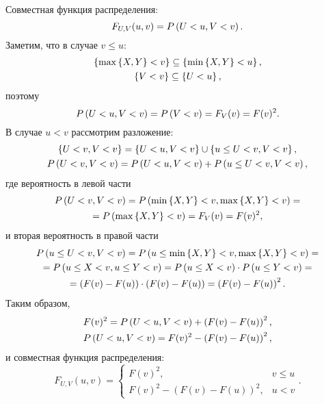Совместная функция распределения:
\begin{equation}
    F_{U,V}(u,v)
    = P \left ( U < u, V < v \right ) .
\end{equation}
Заметим, что в случае $v \le u$:
\begin{gather}
    \left \{ \max \left \{ X, Y \right \} < v \right \} \subseteq \left \{ \min \left \{ X, Y \right \} < u \right \} , \\
    \left \{ V < v \right \} \subseteq \left \{ U < u \right \} ,
\end{gather}
поэтому
\begin{equation}
    P \left ( U < u, V < v \right )
    = P \left ( V < v \right )
    = F_V(v)
    = F(v)^2.
\end{equation}
В случае $u < v$ рассмотрим разложение:
\begin{gather}
    \left \{ U < v, V < v \right \} = \left \{ U < u, V < v \right \} \cup \left \{ u \le U < v, V < v \right \} , \\
    P \left ( U < v, V < v \right ) = P \left ( U < u, V < v \right ) + P \left ( u \le U < v, V < v \right ) ,
\end{gather}
где вероятность в левой части
\begin{multline}
    P \left ( U < v, V < v \right )
    = P \left ( \min \left \{ X, Y \right \} < v, \max \left \{ X, Y \right \} < v \right ) = \\
    = P \left ( \max \left \{ X, Y \right \} < v \right )
    = F_V(v)
    = F(v)^2,
\end{multline}
и вторая вероятность в правой части
\begin{multline}
    P \left ( u \le U < v, V < v \right )
    = P \left ( u \le \min \left \{ X, Y \right \} < v, \max \left \{ X, Y \right \} < v \right ) = \\
    = P \left ( u \le X < v, u \le Y < v \right )
    = P \left ( u \le X < v \right ) \cdot P \left ( u \le Y < v \right ) = \\
    = \left ( F(v) - F(u) \right ) \cdot \left ( F(v) - F(u) \right )
    = \left ( F(v) - F(u) \right )^2 .
\end{multline}
Таким образом,
\begin{gather}
    F(v)^2 = P \left ( U < u, V < v \right ) + \left ( F(v) - F(u) \right )^2 , \\
    P \left ( U < u, V < v \right ) = F(v)^2 - \left ( F(v) - F(u) \right )^2 ,
\end{gather}
и совместная функция распределения:
\begin{equation}
    F_{U,V}(u,v)
    = \left \{
    \begin{array}{ll}
        F(v)^2,                                  & v \le u \\
        F(v)^2 - \left ( F(v) - F(u) \right )^2, & u < v
    \end{array}
    \right .
    .
\end{equation}

